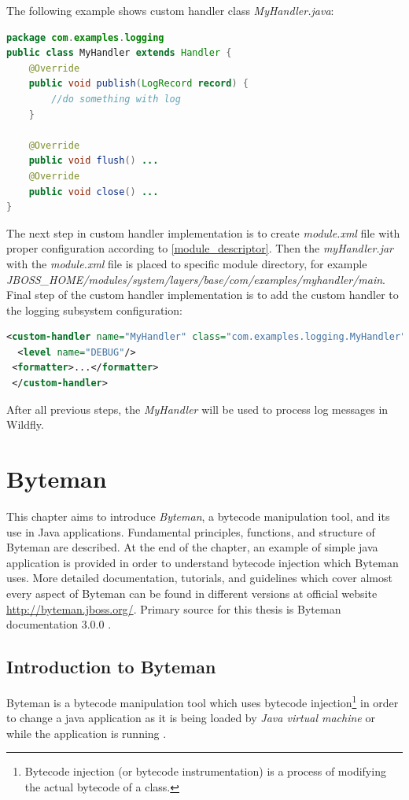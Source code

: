 \documentclass[12pt,oneside]{fithesis2}
\begin{document}
The following example shows custom handler class \textit{MyHandler.java}:
\begin{lstlisting}[caption = Custom handler class, label = custom_handler_class, language=Java]
package com.examples.logging
public class MyHandler extends Handler {
	@Override
	public void publish(LogRecord record) {
		//do something with log
	}
	
	@Override
	public void flush() ...
	@Override
	public void close() ...
}
\end{lstlisting}
\noindent
The next step in custom handler implementation is to create \textit{module.xml} file with proper configuration according to \ref{module_descriptor}. Then the \textit{myHandler.jar} with the \textit{module.xml} file is placed to specific module directory, for example \textit{JBOSS\_HOME/modules/system/layers/base/com/examples/myhandler/main}.
\noindent
Final step of the custom handler implementation is to add the custom handler to the logging subsystem configuration:
\begin{lstlisting}[caption = Adding custom handler to the logging subsystem configuration, label = custom_handler_logging_subsystem, language=XML]
 <custom-handler name="MyHandler" class="com.examples.logging.MyHandler" module="com.examples.myhandler">
  <level name="DEBUG"/>
 <formatter>...</formatter>
 </custom-handler>
\end{lstlisting}
\noindent
After all previous steps, the \textit{MyHandler} will be used to process log messages in Wildfly.

\chapter{Byteman}
\label{byteman_chap}
This chapter aims to introduce \textit{Byteman}, a bytecode manipulation tool, and its use in Java applications. Fundamental principles, functions, and structure of Byteman are described.
At the end of the chapter, an example of simple java application is provided in order to understand bytecode injection which Byteman uses. More detailed documentation, tutorials, and guidelines 
which cover almost every aspect of Byteman can be found in different versions at official website \url{http://byteman.jboss.org/}. Primary source for this thesis is Byteman documentation 3.0.0 \cite{byteman_doc}.

\section{Introduction to Byteman}
Byteman is a bytecode manipulation tool which uses bytecode injection\footnote{Bytecode injection (or bytecode instrumentation) is a process of modifying the actual bytecode of a class.} in order to change a java application as it is being loaded by \textit{Java virtual machine} or while the application is running \cite[Introduction to Byteman]{byteman_doc}.
\end{document}
